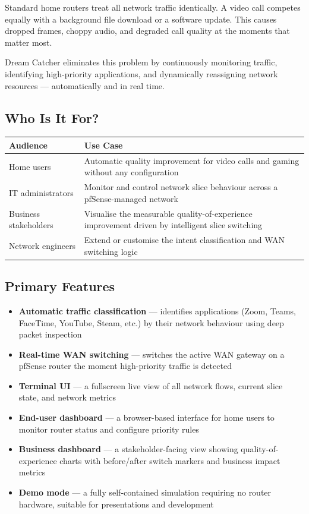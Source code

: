 \documentclass[11pt, a4paper]{article}
\newcommand{\ra}{\rowcolor{tablegray}}
\begin{document}
Standard home routers treat all network traffic identically. A video call competes equally with a background file download or a software update. This causes dropped frames, choppy audio, and degraded call quality at the moments that matter most.

Dream Catcher eliminates this problem by continuously monitoring traffic, identifying high-priority applications, and dynamically reassigning network resources — automatically and in real time.

\subsection{Who Is It For?}

\vspace{0.3em}
\begin{center}
\renewcommand{\arraystretch}{1.3}
\begin{tabular}{L{4.2cm} L{10cm}}
\toprule
{}
\textbf{Audience} & \textbf{Use Case} \\
\midrule
Home users
  & Automatic quality improvement for video calls and gaming without any configuration \\
\ra IT administrators
  & Monitor and control network slice behaviour across a pfSense-managed network \\
Business stakeholders
  & Visualise the measurable quality-of-experience improvement driven by intelligent slice switching \\
\ra Network engineers
  & Extend or customise the intent classification and WAN switching logic \\
\bottomrule
\end{tabular}
\end{center}

\subsection{Primary Features}

\begin{itemize}
  \item \textbf{Automatic traffic classification} — identifies applications (Zoom, Teams, FaceTime, YouTube, Steam, etc.) by their network behaviour using deep packet inspection
  \item \textbf{Real-time WAN switching} — switches the active WAN gateway on a pfSense router the moment high-priority traffic is detected
  \item \textbf{Terminal UI} — a fullscreen live view of all network flows, current slice state, and network metrics
  \item \textbf{End-user dashboard} — a browser-based interface for home users to monitor router status and configure priority rules
  \item \textbf{Business dashboard} — a stakeholder-facing view showing quality-of-experience charts with before/after switch markers and business impact metrics
  \item \textbf{Demo mode} — a fully self-contained simulation requiring no router hardware, suitable for presentations and development
\end{itemize}
\end{document}
